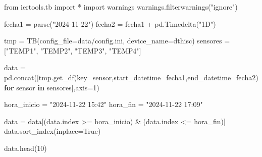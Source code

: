 \documentclass[
  letterpaper,
]{scrbook}
\newenvironment{Shaded}{\begin{snugshade}}{\end{snugshade}}
\newcommand{\ControlFlowTok}[1]{\textcolor[rgb]{0.00,0.23,0.31}{\textbf{#1}}}
\newcommand{\DecValTok}[1]{\textcolor[rgb]{0.68,0.00,0.00}{#1}}
\newcommand{\ImportTok}[1]{\textcolor[rgb]{0.00,0.46,0.62}{#1}}
\newcommand{\KeywordTok}[1]{\textcolor[rgb]{0.00,0.23,0.31}{\textbf{#1}}}
\newcommand{\NormalTok}[1]{\textcolor[rgb]{0.00,0.23,0.31}{#1}}
\newcommand{\OperatorTok}[1]{\textcolor[rgb]{0.37,0.37,0.37}{#1}}
\newcommand{\StringTok}[1]{\textcolor[rgb]{0.13,0.47,0.30}{#1}}
\newcommand{\VariableTok}[1]{\textcolor[rgb]{0.07,0.07,0.07}{#1}}
\begin{document}
\begin{Shaded}
\begin{Highlighting}[]
\ImportTok{from}\NormalTok{ iertools.tb }\ImportTok{import} \OperatorTok{*}
\ImportTok{import}\NormalTok{ warnings}
\NormalTok{warnings.filterwarnings(}\StringTok{"ignore"}\NormalTok{)}

\NormalTok{fecha1 }\OperatorTok{=}\NormalTok{ parse(}\StringTok{"2024{-}11{-}22"}\NormalTok{) }
\NormalTok{fecha2 }\OperatorTok{=}\NormalTok{ fecha1 }\OperatorTok{+}\NormalTok{ pd.Timedelta(}\StringTok{"1D"}\NormalTok{)}

\NormalTok{tmp }\OperatorTok{=}\NormalTok{ TB(config\_file}\OperatorTok{=}\StringTok{\textquotesingle{}data/config.ini\textquotesingle{}}\NormalTok{, device\_name}\OperatorTok{=}\StringTok{\textquotesingle{}dthisc\textquotesingle{}}\NormalTok{)}
\NormalTok{sensores }\OperatorTok{=}\NormalTok{ [}\StringTok{"TEMP1"}\NormalTok{, }\StringTok{"TEMP2"}\NormalTok{, }\StringTok{"TEMP3"}\NormalTok{, }\StringTok{"TEMP4"}\NormalTok{]}

\NormalTok{data }\OperatorTok{=}\NormalTok{ pd.concat([tmp.get\_df(key}\OperatorTok{=}\NormalTok{sensor,start\_datetime}\OperatorTok{=}\NormalTok{fecha1,end\_datetime}\OperatorTok{=}\NormalTok{fecha2) }\ControlFlowTok{for}\NormalTok{ sensor }\KeywordTok{in}\NormalTok{ sensores],axis}\OperatorTok{=}\DecValTok{1}\NormalTok{)}

\NormalTok{hora\_inicio }\OperatorTok{=} \StringTok{"2024{-}11{-}22 15:42"}
\NormalTok{hora\_fin }\OperatorTok{=} \StringTok{"2024{-}11{-}22 17:09"}

\NormalTok{data }\OperatorTok{=}\NormalTok{ data[(data.index }\OperatorTok{\textgreater{}=}\NormalTok{ hora\_inicio) }\OperatorTok{\&}\NormalTok{ (data.index }\OperatorTok{\textless{}=}\NormalTok{ hora\_fin)]}
\NormalTok{data.sort\_index(inplace}\OperatorTok{=}\VariableTok{True}\NormalTok{)}

\NormalTok{data.head(}\DecValTok{10}\NormalTok{)}
\end{Highlighting}
\end{Shaded}
\end{document}
